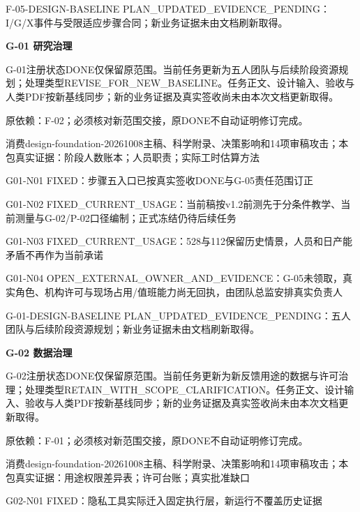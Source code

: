 \documentclass[11pt,a4paper]{article}
\newcommand{\reviewsection}[1]{\par\Needspace{5\baselineskip}\vspace{10pt}\begin{center}{\titlelatin\titlecjk\bfseries\fontsize{14}{20}\selectfont #1}\end{center}}
\begin{document}
F-\allowbreak{}05-\allowbreak{}DESIGN-\allowbreak{}BASELINE PLAN\_\allowbreak{}UPDATED\_\allowbreak{}EVIDENCE\_\allowbreak{}PENDING：I/\allowbreak{}G/\allowbreak{}X事件与受限适应步骤合同；新业务证据未由文档刷新取得。


\reviewsection{G-\allowbreak{}01 研究治理}
G-\allowbreak{}01注册状态DONE仅保留原范围。当前任务更新为五人团队与后续阶段资源规划；处理类型REVISE\_\allowbreak{}FOR\_\allowbreak{}NEW\_\allowbreak{}BASELINE。任务正文、设计输入、验收与人类PDF按新基线同步；新的业务证据及真实签收尚未由本次文档更新取得。


原依赖：F-\allowbreak{}02；必须核对新范围交接，原DONE不自动证明修订完成。


消费design-\allowbreak{}foundation-\allowbreak{}20261008主稿、科学附录、决策影响和14项审稿攻击；本包真实证据：阶段人数账本；人员职责；实际工时估算方法


G01-\allowbreak{}N01 FIXED：步骤五入口已按真实签收DONE与G-\allowbreak{}05责任范围订正


G01-\allowbreak{}N02 FIXED\_\allowbreak{}CURRENT\_\allowbreak{}USAGE：当前稿按v1.2前测先于分条件教学、当前测量与G-\allowbreak{}02/\allowbreak{}P-\allowbreak{}02口径编制；正式冻结仍待后续任务


G01-\allowbreak{}N03 FIXED\_\allowbreak{}CURRENT\_\allowbreak{}USAGE：528与112保留历史情景，人员和日产能矛盾不再作为当前承诺


G01-\allowbreak{}N04 OPEN\_\allowbreak{}EXTERNAL\_\allowbreak{}OWNER\_\allowbreak{}AND\_\allowbreak{}EVIDENCE：G-\allowbreak{}05未领取，真实角色、机构许可与现场占用/\allowbreak{}值班能力尚无回执，由团队总监安排真实负责人


G-\allowbreak{}01-\allowbreak{}DESIGN-\allowbreak{}BASELINE PLAN\_\allowbreak{}UPDATED\_\allowbreak{}EVIDENCE\_\allowbreak{}PENDING：五人团队与后续阶段资源规划；新业务证据未由文档刷新取得。


\reviewsection{G-\allowbreak{}02 数据治理}
G-\allowbreak{}02注册状态DONE仅保留原范围。当前任务更新为新反馈用途的数据与许可治理；处理类型RETAIN\_\allowbreak{}WITH\_\allowbreak{}SCOPE\_\allowbreak{}CLARIFICATION。任务正文、设计输入、验收与人类PDF按新基线同步；新的业务证据及真实签收尚未由本次文档更新取得。


原依赖：F-\allowbreak{}01；必须核对新范围交接，原DONE不自动证明修订完成。


消费design-\allowbreak{}foundation-\allowbreak{}20261008主稿、科学附录、决策影响和14项审稿攻击；本包真实证据：用途权限差异表；许可台账；真实批准缺口


G02-\allowbreak{}N01 FIXED：隐私工具实际迁入固定执行层，新运行不覆盖历史证据
\end{document}
